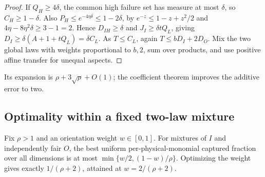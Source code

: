 \begin{proof}
If $Q_H\ge4\delta$, the common high failure set has measure at most
$\delta$, so $C_H\ge1-\delta$. Also
$P_H\le e^{-4\eta\delta}\le1-2\delta$, by
$e^{-z}\le1-z+z^2/2$ and $4\eta-8\eta^2\delta\ge3-1=2$.
Hence $D_{IH}\ge\delta$ and $J_I\ge\delta tQ_L$, giving
$D_I\ge\delta(A+1+tQ_L)=\delta C_L$.
As $T\le C_L$, again $T\le bD_I+2D_O$.
Mix the two global laws with weights proportional to $b,2$, sum over
products, and use positive affine transfer for unequal aspects.
\end{proof}
Its expansion is $\rho+3\sqrt\rho+O(1)$; the coefficient theorem
improves the additive error to two.

\subsection{Optimality within a fixed two-law mixture}
\begin{proposition}
\label{prop:fixed-mixture-optimal}
Fix $\rho>1$ and an orientation weight $w\in[0,1]$. For mixtures of
$I$ and independently fair $O$, the best uniform per-physical-monomial
captured fraction over all dimensions is at most
$\min\{w/2,(1-w)/\rho\}$. Optimizing the weight gives exactly
$1/(\rho+2)$, attained at $w=2/(\rho+2)$.
\end{proposition}
